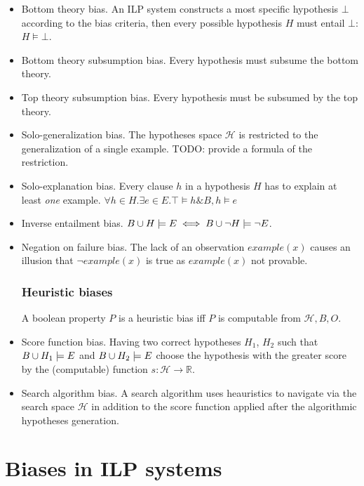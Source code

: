 \begin{itemize}
\item Bottom theory bias. An ILP system constructs a most specific hypothesis $\bot$ according to the bias criteria, then every possible hypothesis $H$ must entail $\bot$: $H \models \bot$.
\item Bottom theory subsumption bias. Every hypothesis must subsume the bottom theory.
\item Top theory subsumption bias. Every hypothesis must be subsumed by the top theory.
\item Solo-generalization bias. The hypotheses space $\mathcal{H}$ is restricted to the generalization of a single example. \cite{muggleton2012mc}
TODO: provide a formula of the restriction.
\item Solo-explanation bias. Every clause $h$ in a hypothesis $H$ has to explain at least \emph{one} example.
$\forall h \in H. \exists e \in E. \top \models h \& B, h \models e$
\item Inverse entailment bias.
$B \cup H \models E \iff B \cup \neg H \models \neg E$.
\item Negation on failure bias. The lack of an observation $example(x)$
causes an illusion that $\neg example(x)$ is true as $example(x)$ not provable.

\subsubsection{Heuristic biases}
\begin{defn}
A boolean property $P$ is a heuristic bias iff $P$ is computable from $\mathcal{H}, B, O$.
\end{defn}
\item Score function bias. Having two correct hypotheses $H_1$, $H_2$ such that $B \cup H_1 \models E$ and $B \cup H_2 \models E$ choose the hypothesis with the greater score by the (computable) function $s:\mathcal{H} \to \mathbb{R}$.
\item Search algorithm bias. A search algorithm uses heauristics to navigate via the search space $\mathcal{H}$ in addition to the score function applied after the algorithmic hypotheses generation.
\end{itemize}

\section{Biases in ILP systems}

\iffalse
\subsection{Progol}
\begin{itemize}
\item Inverse Entailment,
\item a bias provided by mode declaration,
\end{itemize}
\fi

